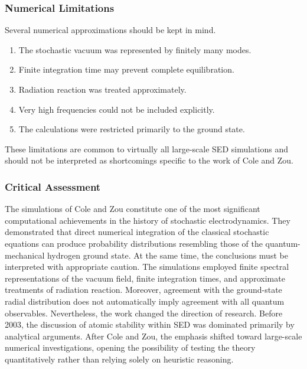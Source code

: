 \subsubsection{Numerical Limitations}
Several numerical approximations should be kept in mind.
\begin{enumerate}
\item
The stochastic vacuum was represented by finitely many modes.
\item
Finite integration time may prevent complete equilibration.
\item
Radiation reaction was treated approximately.
\item
Very high frequencies could not be included explicitly.
\item
The calculations were restricted primarily to the ground state.
\end{enumerate}
These limitations are common to virtually all large-scale SED
simulations and should not be interpreted as shortcomings specific to
the work of Cole and Zou.
\subsubsection*{Critical Assessment}
The simulations of Cole and Zou constitute one of the most significant
computational achievements in the history of stochastic
electrodynamics. They demonstrated that direct numerical integration of
the classical stochastic equations can produce probability
distributions resembling those of the quantum-mechanical hydrogen ground
state.
At the same time, the conclusions must be interpreted with appropriate
caution. The simulations employed finite spectral representations of
the vacuum field, finite integration times, and approximate treatments
of radiation reaction. Moreover, agreement with the ground-state radial
distribution does not automatically imply agreement with all quantum
observables.
Nevertheless, the work changed the direction of research. Before 2003,
the discussion of atomic stability within SED was dominated primarily by
analytical arguments. After Cole and Zou, the emphasis shifted toward
large-scale numerical investigations, opening the possibility of
testing the theory quantitatively rather than relying solely on
heuristic reasoning.
